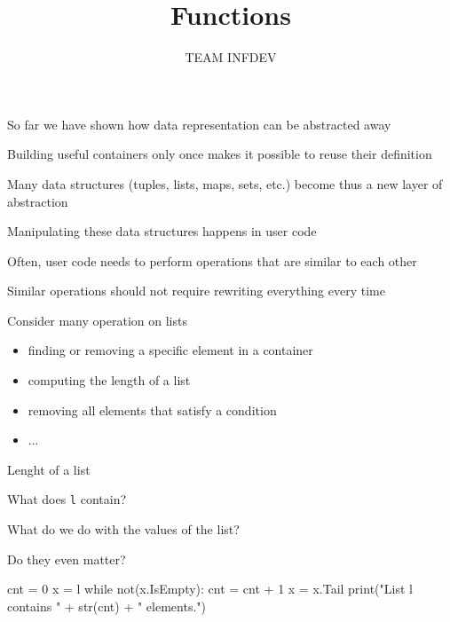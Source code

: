 \documentclass{beamer}
\title{Functions}
\author{TEAM INFDEV}
\institute{Hogeschool Rotterdam \\ 
Rotterdam, Netherlands}
\date{}
\begin{document}
\maketitle

\begin{slide}{
\item So far we have shown how data representation can be abstracted away
\item Building useful containers only once makes it possible to reuse their definition
\item Many data structures (tuples, lists, maps, sets, etc.) become thus a new layer of abstraction
}\end{slide}

\begin{slide}{
\item Manipulating these data structures happens in user code
\item Often, user code needs to perform operations that are similar to each other
\item Similar operations should not require rewriting everything every time
}\end{slide}

\begin{slide}{
\item Consider many operation on lists
\begin{itemize}
\item finding or removing a specific element in a container
\item computing the length of a list
\item removing all elements that satisfy a condition
\item ...
\end{itemize}
}\end{slide}

\begin{frame}[fragile]{Lenght of a list}
\begin{codewithblock}{\pause \item What does \texttt{l} contain? \item What do we do with the values of the list? \item Do they even matter?}
cnt = 0
x = l
while not(x.IsEmpty):
  cnt = cnt + 1
  x = x.Tail
print("List l contains " + str(cnt) + " elements.")
\end{codewithblock}
\end{frame}
\end{document}

